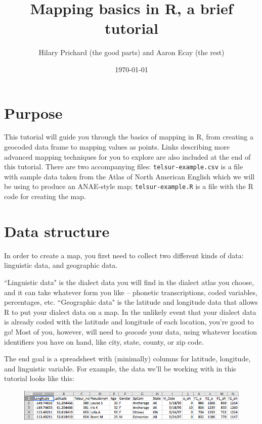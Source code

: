 \documentclass[12pt]{article}
\title{Mapping basics in R, a brief tutorial}
\author{Hilary Prichard (the good parts) and Aaron Ecay (the rest)}
\date{\today}
\begin{document}
\maketitle

\section{Purpose}

This tutorial will guide you through the basics of mapping in R, from creating a geocoded data frame to mapping values as points. Links describing more advanced mapping techniques for you to explore are also included at the end of this tutorial. There are two accompanying files: \texttt{telsur-example.csv} is a file with sample data taken from the Atlas of North American English which we will be using to produce an ANAE-style map; \texttt{telsur-example.R} is a file with the R code for creating the map.

\section{Data structure}

In order to create a map, you first need to collect two different kinds of data: linguistic data, and geographic data.

``Linguistic data" is the dialect data you will find in the dialect atlas you choose, and it can take whatever form you like -- phonetic transcriptions, coded variables, percentages, etc. ``Geographic data" is the latitude and longitude data that allows R to put your dialect data on a map. In the unlikely event that your dialect data is already coded with the latitude and longitude of each location, you're good to go! Most of you, however, will need to \emph{geocode} your data, using whatever location identifiers you have on hand, like city, state, county, or zip code.

The end goal is a spreadsheet with (minimally) columns for latitude, longitude, and linguistic variable. For example, the data we'll be working with in this tutorial looks like this:

\begin{figure}[h]
\includegraphics[width=\linewidth]{data.png}
\end{figure}
\end{document}
